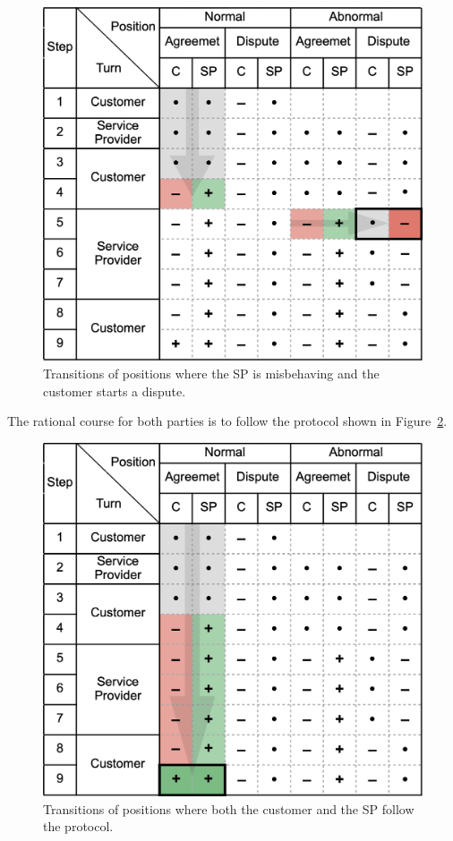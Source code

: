 \documentclass[pdftex,twocolumn,epjc3]{svjour3}
\begin{document}
{\begin{figure}[h!]
\includegraphics[width=\linewidth]{misbehaviour.png}
\centering
\caption{Transitions of positions where the SP is misbehaving and the customer starts a dispute.}
\label{fig:misbehaviour}
\end{figure}

The rational course for both parties is to follow the protocol shown in Figure~\ref{fig:rational}.

\begin{figure}[h!]
\includegraphics[width=\linewidth]{rational.png}
\centering
\caption{Transitions of positions where both the customer and the SP follow the protocol.}
\label{fig:rational}
\end{figure}

}
\end{document}
